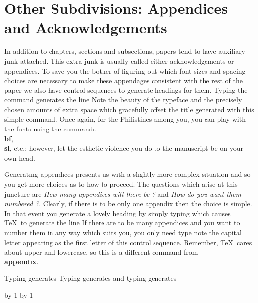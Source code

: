 \section{Other Subdivisions: Appendices and Acknowledgements}
 
In addition to chapters, sections and subsections, papers tend
to have auxiliary junk attached.
This extra junk is usually called either
acknowledgements or appendices.
To save you the bother of figuring out which font sizes and spacing
choices are necessary to make these appendages
consistent with the rest of the paper we also have
control sequences to generate headings for them.
Typing the command
\tc{ \\ack }
generates the line
\ack
Note the beauty of the typeface and the precisely chosen amounts of
extra space which gracefully offset the title generated with this
simple command.
Once again, for the Philistines among you, you can play with
the fonts using the commands {\bf \\bf}, {\bf \\sl}, etc.;
however, let the esthetic violence you do to the manuscript
be on your own head.
 
Generating appendices presents us with a slightly more complex
situation and so you get more choices as to how to proceed.
The questions which arise at this juncture are
{\it How many appendices will there be ?\/} and
{\it How do you want them numbered ?\/}.
Clearly, if there is to be only one appendix then the choice is
simple.
In that event you generate a lovely heading by simply typing
\tc{ \\appendix }
which causes \TeX\ to generate the line
\appendix
If there are to be many appendices and you want to number them
in any way which suits you, you only need type
note the capital letter appearing as the first letter of this control
sequence.
Remember, \TeX\ cares about upper and lowercase, so this is a
different command from { \bf \\appendix}.
 
Typing
generates
\noindent Typing
generates
\endpage
\noindent and typing
generates
 
\recallchap \recallsec \advance\chapternumber by 1
\def\chapterlabel{3.}
\advance\sectionnumber by 1
\def\sectionlabel{\number\sectionnumber \quad}
 
